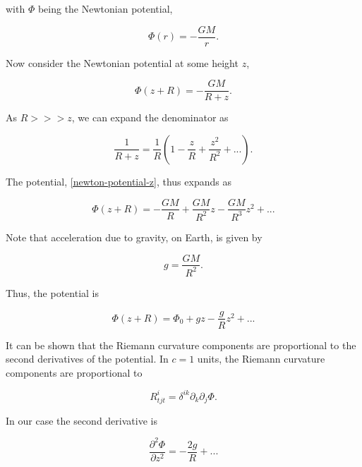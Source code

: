 \documentclass[11pt]{article}
\begin{document}
with $\Phi$ being the Newtonian potential,

\begin{equation}
    \label{newton-potential}
    \Phi(r) = -\frac{GM}{r}.
\end{equation}

Now consider the Newtonian potential at some height $z$,

\begin{equation}
    \label{newton-potential-z}
    \Phi(z + R) = -\frac{GM}{R+z}.
\end{equation}

As $R >>> z$, we can expand the denominator as

\begin{equation}
    \frac{1}{R + z} = \frac{1}{R}\left( 1- \frac{z}{R} + \frac{z^2}{R^2} + ... \right).
\end{equation}

The potential, \eqref{newton-potential-z}, thus expands as

\begin{equation}
    \label{netwon-pot-expanded-z-2}
    \Phi(z + R) = -\frac{GM}{R} + \frac{GM}{R^2}z - \frac{GM}{R^3}z^2 + ...
\end{equation}

Note that acceleration due to gravity, on Earth, is given by

\begin{equation}
    \label{g-def}
    g = \frac{GM}{R^2}.
\end{equation}

Thus, the potential is

\begin{equation}
    \Phi(z + R) = \Phi_0 + gz - \frac{g}{R}z^2 + ...
\end{equation}

It can be shown that the Riemann curvature components are proportional to the second derivatives of the potential. In $c = 1$ units, the Riemann curvature components are proportional to

\begin{equation}
    \label{riemann-staic-weak-field}
    R^i _{tjt} = \delta^{ik} \partial_k \partial_j \Phi.
\end{equation}

In our case the second derivative is

\begin{equation}
    \frac{\partial ^2 \Phi}{\partial z^2} = -\frac{2g}{R} + ...
\end{equation}
\end{document}
